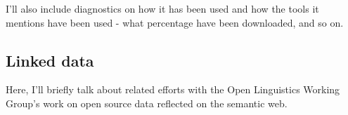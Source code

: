 I'll also include diagnostics on how it has been used and how the tools it mentions have been used - what percentage have been downloaded, and so on.

\subsection{Linked data}

Here, I'll briefly talk about related efforts with the Open Linguistics Working Group's \citep{chiarcos2012open} work on open source data reflected on the semantic web.\citep{chiarcos2013building}



%


